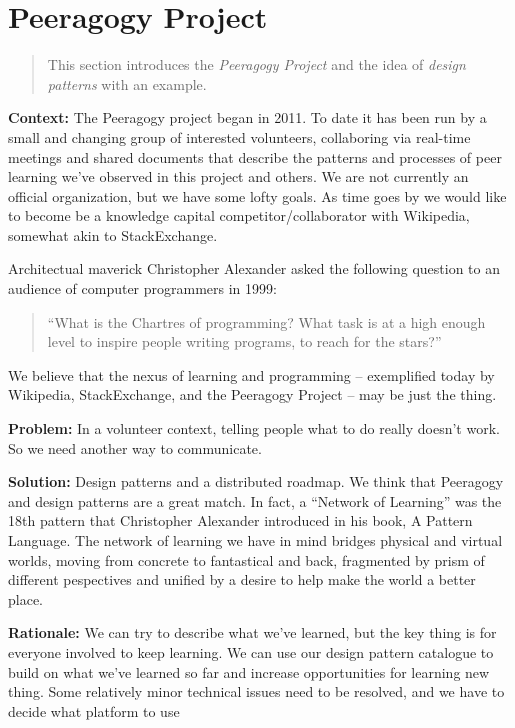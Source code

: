 \section{Peeragogy Project}

\begin{quote}
This section introduces the \emph{Peeragogy Project} and the idea of \emph{design patterns} with an example.
\end{quote}

\textbf{Context:}  The Peeragogy project began in 2011.  To date it has been run by a small and changing group of interested volunteers, collaboring via real-time meetings and shared documents that describe the patterns and processes of peer learning we've observed in this project and others.   We are not currently an official organization, but we have some lofty goals.  As time goes by we would like to become be a knowledge capital competitor/collaborator with Wikipedia, somewhat akin to StackExchange.

Architectual maverick Christopher Alexander asked the following question to an audience of computer programmers in 1999: 
\begin{quote}
``What is the Chartres of programming? What task is at a high enough level to inspire people writing programs, to reach for the stars?''
\end{quote}
We believe that the nexus of learning and programming -- exemplified today by Wikipedia, StackExchange, and the Peeragogy Project -- may be just the thing.

\textbf{Problem:} In a volunteer context, telling people what to do really doesn't work.  So we need another way to communicate.

\textbf{Solution:} Design patterns and a distributed roadmap.
We think that Peeragogy and design patterns are a great match.  In fact, a ``Network of Learning'' was the 18th pattern that Christopher Alexander introduced in his book, A Pattern Language.  The network of learning we have in mind bridges physical and virtual worlds, moving from concrete to fantastical and back, fragmented by prism of different pespectives and unified by a desire to help make the world a better place. 

\textbf{Rationale:}
We can try to describe what we've learned, but the key thing is for everyone involved to keep learning. We can use our design pattern catalogue to build on what we've learned so far and increase opportunities for learning new thing.
Some relatively minor technical issues need to be resolved, and we
have to decide what platform to use

